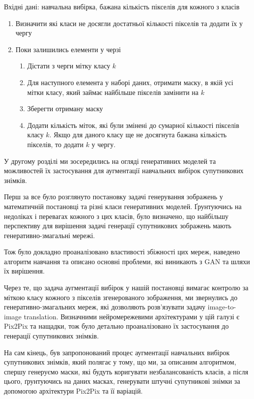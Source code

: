 \begin{algorithm} \leavevmode \linebreak
    Вхідні дані: навчальна вибірка, бажана кількість пікселів для кожного з класів
    \begin{enumerate}
        \item Визначити які класи не досягли достатньої кількості пікселів та додати їх у чергу
        \item Поки залишились елементи у черзі

              \begin{enumerate}
                  \item Дістати з черги мітку класу $k$
                  \item Для наступного елемента у наборі даних, отримати маску,
                        в якій усі мітки класу, який займає найбільше пікселів замінити
                        на $k$
                  \item Зберегти отриману маску
                  \item Додати кількість міток, які були змінені до
                  сумарної кількості пікселів класу $k$. Якщо для даного
                  класу ще не досягнута бажана кількість пікселів, то додати $k$ у чергу.
              \end{enumerate}
    \end{enumerate}
\end{algorithm}

\chapconclude{\ref{chap:gans}}

У другому розділі ми зосередились на огляді
генеративних моделей та можливостей їх
застосування для аугментації навчальних вибірок
супутникових знімків.

Перш за все було розглянуто постановку задачі
генерування зображень у математичній постановці та
різні класи генеративних моделей. Ґрунтуючись на недоліках і
перевагах кожного з цих класів, було визначено,
що найбільшу перспективу для вирішення задачі генерації
супутникових зображень мають генеративно-змагальні мережі.

Тож було докладно проаналізовано властивості збіжності цих мереж,
наведено алгоритм навчання та описано основні проблеми, які
виникають з GAN та шляхи їх вирішення.

Через те, що задача аугментації вибірок у нашій постановці вимагає
контролю за міткою класу кожного з пікселів згенерованого зображення,
ми звернулись до генеративно-змагальних мереж, які дозволяють
розв'язувати задачу image-to-image translation. Визначними нейромережевими
архітектурами у цій галузі є Pix2Pix та нащадки, тож було
детально проаналізовано їх застосування до
генерації супутникових знімків.

На сам кінець, був запропонований процес аугментації навчальних вибірок супутникових
знімків, який полягає у тому, що ми, за описаним алгоритмом, спершу
генеруємо маски, які будуть коригувати незбалансованість класів,
а після цього, ґрунтуючись на даних масках, генерувати штучні
супутникові знімки за допомогою
архітектури Pix2Pix та її варіацій.
